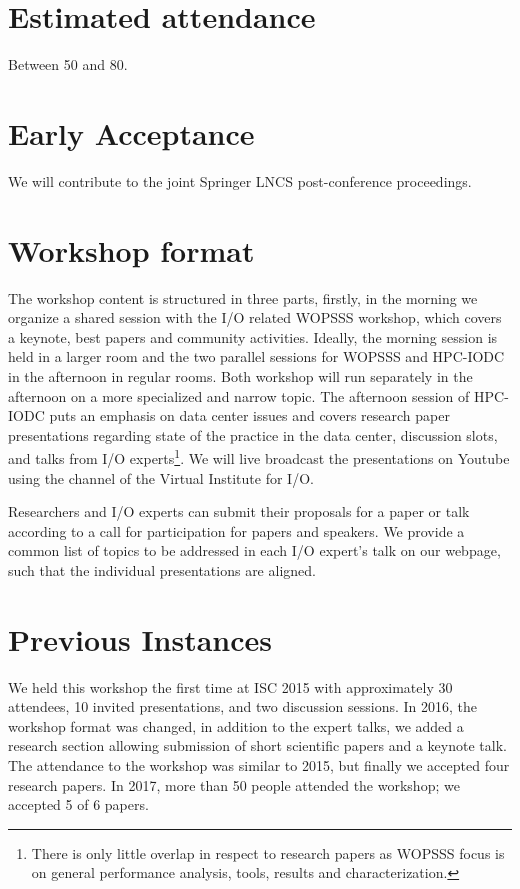 \documentclass[a4paper,10pt]{article}
\begin{document}
\section{Estimated attendance}
Between 50 and 80.

\section{Early Acceptance}

We will contribute to the joint Springer LNCS post-conference proceedings.


\section{Workshop format}
The workshop content is structured in three parts, firstly, in the morning we organize a shared session with the I/O related WOPSSS workshop, which covers a keynote, best papers and community activities.
Ideally, the morning session is held in a larger room and the two parallel sessions for WOPSSS and HPC-IODC in the afternoon in regular rooms.
Both workshop will run separately in the afternoon on a more specialized and narrow topic.
The afternoon session of HPC-IODC puts an emphasis on data center issues and covers research paper presentations regarding state of the practice in the data center, discussion slots, and talks from I/O experts\footnote{
There is only little overlap in respect to research papers as WOPSSS focus is on general performance analysis, tools, results and characterization.}.
We will live broadcast the presentations on Youtube using the channel of the  Virtual Institute for I/O.

Researchers and I/O experts can submit their proposals for a paper or talk according to a call for participation for papers and speakers.
We provide a common list of topics to be addressed in each I/O expert's talk on our  webpage, such that the individual presentations are aligned.



\section{Previous Instances}
We held this workshop the first time at ISC 2015 with approximately 30 attendees, 10 invited presentations, and two discussion sessions.
In 2016, the workshop format was changed, in addition to the expert talks, we added a research section allowing submission of short scientific papers and a keynote talk.
The attendance to the workshop was similar to 2015, but finally we accepted four research papers.
In 2017, more than 50 people attended the workshop; we accepted 5 of 6 papers.
\end{document}
